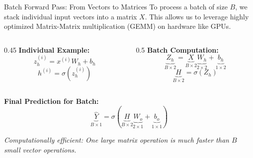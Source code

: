 \documentclass[5pt,aspectratio=169]{beamer}
\begin{document}
\begin{frame}{Batch Forward Pass: From Vectors to Matrices}
To process a batch of size $B$, we stack individual input vectors into a matrix $X$. This allows us to leverage highly optimized Matrix-Matrix multiplication (GEMM) on hardware like GPUs.

\begin{columns}[T]
\begin{column}{0.45\textwidth}
\textbf{Individual Example:}
{\footnotesize
\[ z^{(i)}_h = x^{(i)} W_h + b_h \]
\[ h^{(i)} = \sigma(z^{(i)}_h) \]
}
\end{column}
\begin{column}{0.5\textwidth}
\textbf{Batch Computation:}
{\footnotesize
\[ \underbrace{Z_h}_{B \times 2} = \underbrace{X}_{B \times 2} \underbrace{W_h}_{2 \times 2} + \underbrace{b_h}_{1 \times 2} \]
\[ \underbrace{H}_{B \times 2} = \sigma(Z_h) \]
}
\end{column}
\end{columns}

\vspace{0.8cm}
\textbf{Final Prediction for Batch:}
\[ \underbrace{\hat{Y}}_{B \times 1} = \sigma \left( \underbrace{H}_{B \times 2} \underbrace{W_o}_{2 \times 1} + \underbrace{b_o}_{1 \times 1} \right) \]

\centering
\textit{Computationally efficient: One large matrix operation is much faster than $B$ small vector operations.}
\end{frame}
\end{document}
